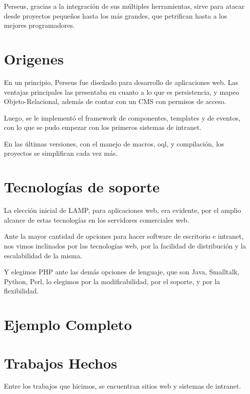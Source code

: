 \documentclass[a4paper,10pt]{article}
\begin{document}
Perseus, gracias a la integración de sus múltiples herramientas, sirve para atacar desde proyectos pequeños hasta los más grandes, que
petrifican hasta a los mejores programadores.

\section{Origenes}

En un principio, Perseus fue diseñado para desarrollo de aplicaciones web. Las ventajas principales
las presentaba en cuanto a lo que es persistencia, y mapeo Objeto-Relacional, además de contar con un
CMS con permisos de acceso.

Luego, se le implementó el framework de componentes, templates y de eventos, con lo que se pudo empezar con los primeros sistemas de intranet.

En las últimas versiones, con el manejo de macros, oql, y compilación, los proyectos se simplifican cada vez más.

\section{Tecnologías de soporte}

La elección inicial de LAMP, para aplicaciones web, era evidente, por el amplio alcance de estas tecnologías en los servidores comerciales web.

Ante la mayor cantidad de opciones para hacer software de escritorio e intranet, nos vimos inclinados por las tecnologías web, por la facilidad
de distribución y la escalabilidad de la misma.

Y elegimos PHP ante las demás opciones de lenguaje, que son Java, Smalltalk, Python, Perl, lo elegimos por la modificabilidad, por el soporte, y
por la flexibilidad.



\section{Ejemplo Completo}
\section{Trabajos Hechos}
Entre los trabajos que hicimos, se encuentran sitios web y sistemas de intranet.

\end{document}
